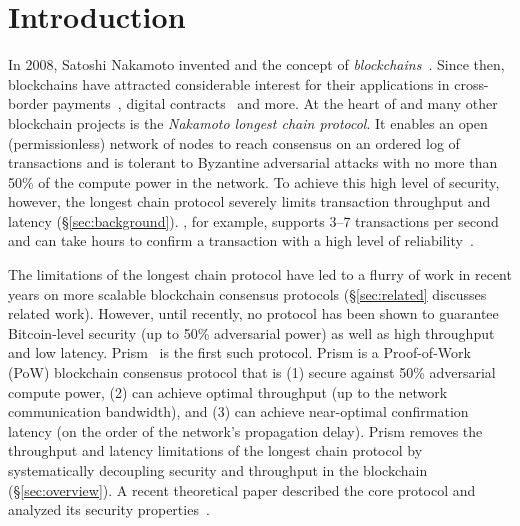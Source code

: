 
\chapter{Introduction}

In 2008, Satoshi Nakamoto invented \bitcoin and the concept of {\em blockchains}~\cite{bitcoin}. Since then, blockchains have attracted considerable interest for their applications in cross-border payments~\cite{hileman2017global,kazan2015value}, digital contracts~\cite{cong2019blockchain,wust2018you,pilkington201611} and more. At the heart of \bitcoin and many other blockchain projects is the {\em Nakamoto longest chain protocol}. It enables an open (permissionless) network of nodes to reach consensus on an ordered log of transactions and is tolerant to Byzantine adversarial attacks with no more than 50\% of the compute power in the network. To achieve this high level of security, however, the longest chain protocol severely limits transaction throughput and latency  (\S\ref{sec:background}). \bitcoin, for example, supports 3--7 transactions per second and can take hours to confirm a transaction with a high level of reliability~\cite{bitcoin}.  


The limitations of the longest chain protocol have led to a flurry of work in recent years on more scalable blockchain consensus protocols (\S\ref{sec:related} discusses related work). However, until recently, no protocol has been shown to guarantee Bitcoin-level security (up to 50\% adversarial power) as well as high throughput and low latency. Prism~\cite{prism-theory} is the first such protocol. Prism is a Proof-of-Work (PoW) blockchain consensus protocol that is  (1) secure against 50\% adversarial compute power, (2) can achieve optimal throughput (up to the network communication bandwidth), and (3) can achieve near-optimal confirmation latency (on the order of the network's propagation delay). Prism removes the throughput and latency limitations of the longest chain protocol by systematically decoupling security and throughput in the blockchain  (\S\ref{sec:overview}).  
A recent theoretical paper described the core protocol and analyzed its security properties~\cite{prism-theory}.

